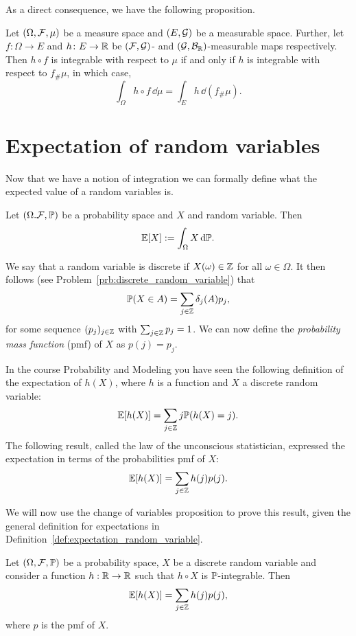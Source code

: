 \bigskip

As a direct consequence, we have the following proposition.
\begin{proposition}
Let $(\Omega, \mathcal F, \mu)$ be a measure space and $(E,\mathcal G)$ be a measurable space. Further, let $f\colon \Omega \to E$ and $h\colon E \to \mathbb R$ be $(\mathcal F,\mathcal G)$- and $(\mathcal G,\mathcal B_{\mathbb R})$-measurable maps respectively. Then $h \circ f$ is integrable with respect to $\mu$ if and only if $h$ is integrable with respect to $f_\# \mu$, in which case,
\[
\int_\Omega h \circ f\, \dd \mu = \int_E h \, \dd (f_\# \mu).
\]
\end{proposition}

\section{Expectation of random variables}

Now that we have a notion of integration we can formally define what the expected value of a random variables is.

\begin{definition}\label{def:expectation_random_variable}
Let $(\Omega. \mathcal F, \mathbb P)$ be a probability space and $X$ and random variable. Then
\[
	\mathbb E[X] := \int_\Omega X \, \mathrm{d} \mathbb P.
\]
\end{definition}

We say that a random variable is discrete if $X(\omega) \in \mathbb Z$ for all $\omega \in \Omega$. It then follows (see Problem~\ref{prb:discrete_random_variable}) that 
\[
	\mathbb P(X \in A) = \sum_{j \in \mathbb Z} \delta_j(A) p_j,
\]
for some sequence $(p_j)_{j \in \mathbb Z}$ with $\sum_{j \in \mathbb Z} p_j = 1$. We can now define the \emph{probability mass function} (pmf) of $X$ as $p(j) = p_j$.

In the course Probability and Modeling you have seen the following definition of the expectation of $h(X)$, where $h$ is a function and $X$ a discrete random variable:
\[
	\mathbb E[h(X)] = \sum_{j \in \mathbb Z} j \mathbb P(h(X) = j).
\]
The following result, called the law of the unconscious statistician, expressed the expectation in terms of the probabilities pmf of $X$:
\[
	\mathbb E[h(X)] = \sum_{j \in \mathbb Z} h(j) p(j).
\] 

We will now use the change of variables proposition to prove this result, given the general definition for expectations in Definition~\ref{def:expectation_random_variable}.


\begin{lemma}
Let $(\Omega, \mathcal F, \mathbb{P})$ be a probability space, $X$ be a discrete random variable and consider a function $h : \mathbb R \to \mathbb R$ such that $h\circ X$ is $\mathbb P$-integrable. Then
\[
	\mathbb E[h(X)] = \sum_{j \in \mathbb Z} h(j) p(j),
\] 
where $p$ is the pmf of $X$.
\end{lemma}


